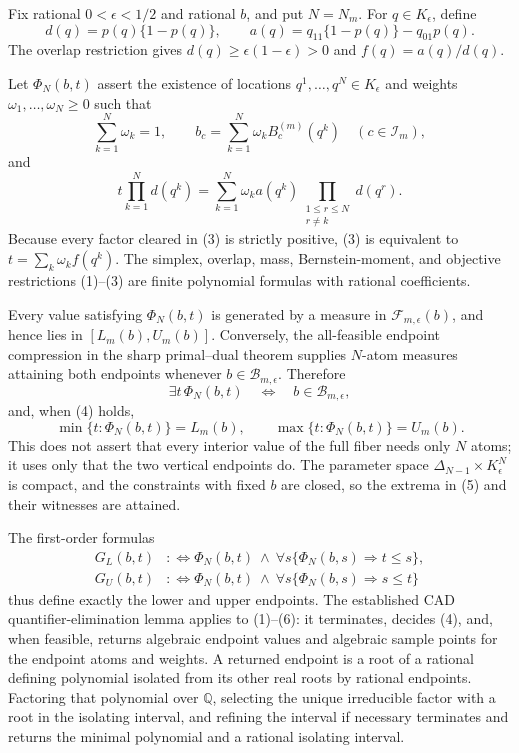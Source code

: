 Fix rational \(0<\epsilon<1/2\) and rational \(b\), and put \(N=N_m\).  For \(q\in K_{\epsilon}\), define
\[
 d(q)=p(q)\{1-p(q)\},
 \qquad a(q)=q_{11}\{1-p(q)\}-q_{01}p(q).
\tag{1}
\]
The overlap restriction gives \(d(q)\geq\epsilon(1-\epsilon)>0\) and \(f(q)=a(q)/d(q)\).

Let \(\Phi_N(b,t)\) assert the existence of locations \(q^1,\ldots,q^N\in K_{\epsilon}\) and weights \(\omega_1,\ldots,\omega_N\geq0\) such that
\[
 \sum_{k=1}^N\omega_k=1,\qquad
 b_c=\sum_{k=1}^N\omega_kB_c^{(m)}(q^k)\quad(c\in\mathcal I_m),
\tag{2}
\]
and
\[
 t\prod_{k=1}^Nd(q^k)
 =\sum_{k=1}^N\omega_ka(q^k)
   \prod_{\substack{1\leq r\leq N\\r\neq k}}d(q^r).
\tag{3}
\]
Because every factor cleared in (3) is strictly positive, (3) is equivalent to \(t=\sum_k\omega_kf(q^k)\).  The simplex, overlap, mass, Bernstein-moment, and objective restrictions (1)--(3) are finite polynomial formulas with rational coefficients.

Every value satisfying \(\Phi_N(b,t)\) is generated by a measure in \(\mathcal F_{m,\epsilon}(b)\), and hence lies in \([L_m(b),U_m(b)]\).  Conversely, the all-feasible endpoint compression in the sharp primal--dual theorem supplies \(N\)-atom measures attaining both endpoints whenever \(b\in\mathcal B_{m,\epsilon}\).  Therefore
\[
 \exists t\,\Phi_N(b,t)\quad\Longleftrightarrow\quad
 b\in\mathcal B_{m,\epsilon},
\tag{4}
\]
and, when (4) holds,
\[
 \min\{t:\Phi_N(b,t)\}=L_m(b),\qquad
 \max\{t:\Phi_N(b,t)\}=U_m(b).
\tag{5}
\]
This does not assert that every interior value of the full fiber needs only \(N\) atoms; it uses only that the two vertical endpoints do.  The parameter space \(\Delta_{N-1}\times K_{\epsilon}^N\) is compact, and the constraints with fixed \(b\) are closed, so the extrema in (5) and their witnesses are attained.

The first-order formulas
\[
 \begin{split}
 G_L(b,t)&:\Longleftrightarrow
 \Phi_N(b,t)\ \wedge\ \forall s\{\Phi_N(b,s)\Rightarrow t\leq s\},\\
 G_U(b,t)&:\Longleftrightarrow
 \Phi_N(b,t)\ \wedge\ \forall s\{\Phi_N(b,s)\Rightarrow s\leq t\}
 \end{split}
\tag{6}
\]
thus define exactly the lower and upper endpoints.  The established CAD quantifier-elimination lemma applies to (1)--(6): it terminates, decides (4), and, when feasible, returns algebraic endpoint values and algebraic sample points for the endpoint atoms and weights.  A returned endpoint is a root of a rational defining polynomial isolated from its other real roots by rational endpoints.  Factoring that polynomial over \(\mathbb Q\), selecting the unique irreducible factor with a root in the isolating interval, and refining the interval if necessary terminates and returns the minimal polynomial and a rational isolating interval.

